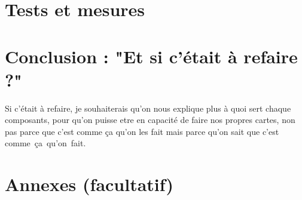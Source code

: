 \documentclass{rapport}
\begin{document}
 

\section{Tests et mesures}

\label{sec:tests_measurements}



 

\section{Conclusion : "Et si c'était à refaire ?"}

\label{sec:conclusion}

Si c'était à refaire, je souhaiterais qu'on nous explique plus à quoi sert chaque composants, pour qu'on puisse etre en capacité de faire nos propres cartes, non pas parce que c'est comme ça qu'on les fait mais parce qu'on sait que c'est comme ça qu'on fait.

 

\section*{Annexes (facultatif)}


 
\end{document}
